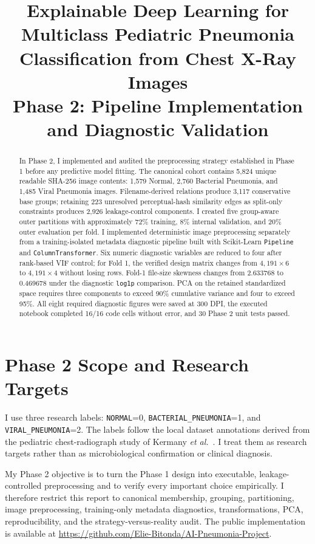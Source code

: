 \documentclass[conference]{IEEEtran}
\title{Explainable Deep Learning for Multiclass Pediatric Pneumonia Classification from Chest X-Ray Images\\
\large Phase 2: Pipeline Implementation and Diagnostic Validation}
\author{
\IEEEauthorblockN{Elie Bitonda Tuyizere}
\IEEEauthorblockA{Carnegie Mellon University Africa\\
04-652 Artificial Intelligence System Design\\
\href{mailto:ebitonda@andrew.cmu.edu}{ebitonda@andrew.cmu.edu}\\
\url{github.com/Elie-Bitonda/AI-Pneumonia-Project}}
}
\begin{document}
\maketitle

\begin{abstract}
In Phase 2, I implemented and audited the preprocessing strategy established in Phase 1 before any predictive model fitting. The canonical cohort contains 5,824 unique readable SHA-256 image contents: 1,579 Normal, 2,760 Bacterial Pneumonia, and 1,485 Viral Pneumonia images. Filename-derived relations produce 3,117 conservative base groups; retaining 223 unresolved perceptual-hash similarity edges as split-only constraints produces 2,926 leakage-control components. I created five group-aware outer partitions with approximately 72\% training, 8\% internal validation, and 20\% outer evaluation per fold. I implemented deterministic image preprocessing separately from a training-isolated metadata diagnostic pipeline built with Scikit-Learn \texttt{Pipeline} and \texttt{ColumnTransformer}. Six numeric diagnostic variables are reduced to four after rank-based VIF control; for Fold 1, the verified design matrix changes from $4{,}191\times6$ to $4{,}191\times4$ without losing rows. Fold-1 file-size skewness changes from 2.633768 to 0.469678 under the diagnostic \texttt{log1p} comparison. PCA on the retained standardized space requires three components to exceed 90\% cumulative variance and four to exceed 95\%. All eight required diagnostic figures were saved at 300 DPI, the executed notebook completed 16/16 code cells without error, and 30 Phase 2 unit tests passed.
\end{abstract}

\section{Phase 2 Scope and Research Targets}

I use three research labels: \texttt{NORMAL}=0, \texttt{BACTERIAL\_PNEUMONIA}=1, and \texttt{VIRAL\_PNEUMONIA}=2. The labels follow the local dataset annotations derived from the pediatric chest-radiograph study of Kermany \emph{et al.}~\cite{kermany2018}. I treat them as research targets rather than as microbiological confirmation or clinical diagnosis.

My Phase 2 objective is to turn the Phase 1 design into executable, leakage-controlled preprocessing and to verify every important choice empirically. I therefore restrict this report to canonical membership, grouping, partitioning, image preprocessing, training-only metadata diagnostics, transformations, PCA, reproducibility, and the strategy-versus-reality audit. The public implementation is available at \url{https://github.com/Elie-Bitonda/AI-Pneumonia-Project}.
\end{document}
